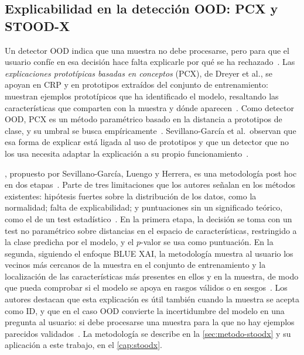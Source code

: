 \subsection{Explicabilidad en la detección OOD: PCX y STOOD-X}\label{sec:ea-xai-ood}

Un detector OOD indica que una muestra no debe procesarse, pero para que el
usuario confíe en esa decisión hace falta explicarle por qué se ha
rechazado~\cite{sevillano2026}. Las \emph{explicaciones prototípicas basadas en
conceptos} (PCX), de Dreyer et al., se apoyan en CRP y en prototipos extraídos del
conjunto de entrenamiento: muestran ejemplos prototípicos que ha identificado el
modelo, resaltando las características que comparten con la muestra y dónde
aparecen~\cite{sevillano2026,sevillano2025tesis}. Como detector OOD, PCX es un
método paramétrico basado en la distancia a prototipos de clase, y su umbral se
busca empíricamente~\cite{sevillano2026,sevillano2025tesis}. Sevillano-García et
al.\ observan que esa forma de explicar está ligada al uso de prototipos y que un
detector que no los usa necesita adaptar la explicación a su propio
funcionamiento~\cite{sevillano2026}.

\stoodx, propuesto por Sevillano-García, Luengo y Herrera, es una metodología post
hoc en dos etapas~\cite{sevillano2026}. Parte de tres limitaciones que los autores
señalan en los métodos existentes: hipótesis fuertes sobre la distribución de los
datos, como la normalidad; falta de explicabilidad; y puntuaciones sin un
significado teórico, como el de un test estadístico~\cite{sevillano2026}. En la
primera etapa, la decisión se toma con un test no paramétrico sobre distancias en
el espacio de características, restringido a la clase predicha por el modelo, y
el $p$-valor se usa como puntuación. En la segunda, siguiendo el enfoque BLUE XAI,
la metodología muestra al usuario los vecinos más cercanos de la muestra en el
conjunto de entrenamiento y la localización de las características más presentes
en ellos y en la muestra, de modo que pueda comprobar si el modelo se apoya en
rasgos válidos o en sesgos~\cite{sevillano2026}. Los autores destacan que esta
explicación es útil también cuando la muestra se acepta como ID, y que en el caso
OOD convierte la incertidumbre del modelo en una pregunta al usuario: si debe
procesarse una muestra para la que no hay ejemplos parecidos
validados~\cite{sevillano2026}. La metodología se describe en la
\cref{sec:metodo-stoodx} y su aplicación a este trabajo, en el
\cref{cap:stoodx}.

